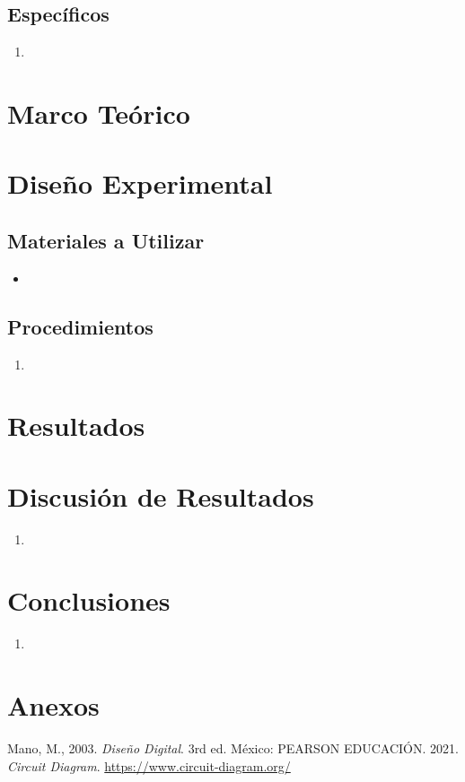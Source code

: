 \documentclass[conference]{IEEEtran}
\begin{document}
\subsection{Específicos}
    \begin{enumerate}
        \item 
    \end{enumerate}
    
\section{Marco Teórico}
    
\section{Diseño Experimental}
    \subsection{Materiales a Utilizar}
        \begin{itemize}
    	\item 
    \end{itemize}

    \subsection{Procedimientos}
        \begin{enumerate}
            \item 
        \end{enumerate}
\section{Resultados}
    
\section{Discusión de Resultados}
\begin{enumerate}
    \item 
   
\end{enumerate}
\section{Conclusiones}
\begin{enumerate}
    \item 
\end{enumerate}

\section{Anexos}

\begin{thebibliography}{00}
 Mano, M., 2003. \textit{Diseño Digital}. 3rd ed. México: PEARSON EDUCACIÓN.
 2021. \textit{Circuit Diagram}. \url{https://www.circuit-diagram.org/}
\end{thebibliography}
\end{document}
